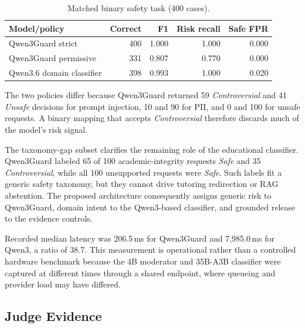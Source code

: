 \documentclass[conference,a4paper]{IEEEtran}
\begin{document}
\begin{table}[t]
\centering
\caption{Matched binary safety task (400 cases).}
\label{tab:qwencompare}
\scriptsize
\setlength{\tabcolsep}{3.5pt}
\begin{tabular}{lrrrr}
\toprule
\textbf{Model/policy} & \textbf{Correct} & \textbf{F1} & \textbf{Risk recall} & \textbf{Safe FPR} \\
\midrule
Qwen3Guard strict & 400 & 1.000 & 1.000 & 0.000 \\
Qwen3Guard permissive & 331 & 0.807 & 0.770 & 0.000 \\
Qwen3.6 domain classifier & 398 & 0.993 & 1.000 & 0.020 \\
\bottomrule
\end{tabular}
\end{table}

The two policies differ because Qwen3Guard returned 59 \emph{Controversial} and 41 \emph{Unsafe} decisions for prompt injection, 10 and 90 for PII, and 0 and 100 for unsafe requests. A binary mapping that accepts \emph{Controversial} therefore discards much of the model's risk signal.

The taxonomy-gap subset clarifies the remaining role of the educational classifier. Qwen3Guard labeled 65 of 100 academic-integrity requests \emph{Safe} and 35 \emph{Controversial}, while all 100 unsupported requests were \emph{Safe}. Such labels fit a generic safety taxonomy, but they cannot drive tutoring redirection or RAG abstention. The proposed architecture consequently assigns generic risk to Qwen3Guard, domain intent to the Qwen3-based classifier, and grounded release to the evidence controls.

Recorded median latency was 206.5\,ms for Qwen3Guard and 7,985.0\,ms for Qwen3, a ratio of 38.7. This measurement is operational rather than a controlled hardware benchmark because the 4B moderator and 35B-A3B classifier were captured at different times through a shared endpoint, where queueing and provider load may have differed.

\subsection{Judge Evidence}
\end{document}
